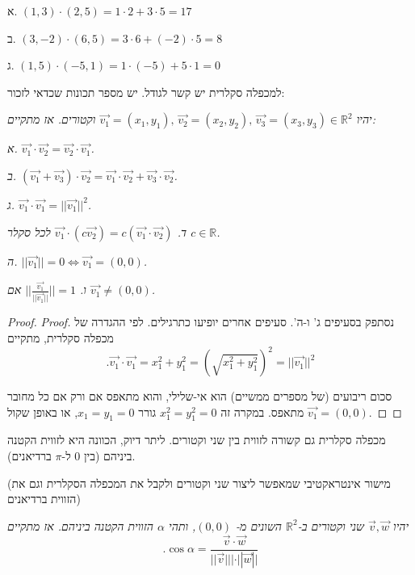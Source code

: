 \documentclass[
  hebrew,
  12pt,
  a4paper,
  oneside]{book}
\theoremstyle{definition}
\theoremstyle{remark}
\theoremstyle{plain}
\theoremstyle{remark}
\begin{document}
\begin{example}

א. \((1,3)\cdot(2,5)=1\cdot2+3\cdot5=17\)

ב. \((3,-2)\cdot(6,5)=3\cdot6+(-2)\cdot5=8\)

ג. \((1,5)\cdot(-5,1)=1\cdot(-5)+5\cdot1=0\)

\end{example}

למכפלה סקלרית יש קשר לגודל. יש מספר תכונות שכדאי לזכור:

\begin{proposition}

\emph{יהיו
\(\vec{v_{1}}=(x_{1},y_{1}),\,\vec{v_{2}}=(x_{2},y_{2}),\,\vec{v_{3}}=(x_{3},y_{3})\in\mathbb{R}^{2}\)
וקטורים. אז מתקיים:}

\emph{א. \(\vec{v_{1}}\cdot\vec{v_{2}}=\vec{v_{2}}\cdot\vec{v_{1}}\).}

\emph{ב.
\((\vec{v_{1}}+\vec{v_{3}})\cdot\vec{v_{2}}=\vec{v_{1}}\cdot\vec{v_{2}}+\vec{v_{3}}\cdot\vec{v_{2}}\).}

\emph{ג. \(\vec{v_{1}}\cdot\vec{v_{1}}=||\vec{v_{1}}||^{2}\).}

\emph{ד.
\(\vec{v_{1}}\cdot(c\vec{v_{2}})=c(\vec{v_{1}}\cdot\vec{v_{2}})\) לכל
סקלר \(c\in\mathbb{R}\).}

\emph{ה. \(||\vec{v_{1}}||=0\iff\vec{v_{1}}=(0,0)\).}

\emph{ו. \(||\frac{\vec{v_{1}}}{||\vec{v_{1}}||}||=1\) אם
\(\vec{v_{1}}\neq(0,0)\).}

\end{proposition}

\begin{proof}
\emph{Proof.} נסתפק בסעיפים ג' ו-ה'. סעיפים אחרים יופיעו כתרגילים. לפי
ההגדרה של מכפלה סקלרית, מתקיים
\[.\vec{v_{1}}\cdot\vec{v_{1}}=x_{1}^{2}+y_{1}^{2}=\left(\sqrt{x_{1}^{2}+y_{1}^{2}}\right)^{2}=||\vec{v_{1}}||^{2}\]

סכום ריבועים (של מספרים ממשיים) הוא אי-שלילי, והוא מתאפס אם ורק אם כל
מחובר מתאפס. במקרה זה \(x_{1}^{2}=y_{1}^{2}=0\) גורר \(x_{1}=y_{1}=0\),
או באופן שקול \(\vec{v_{1}}=(0,0)\).~◻
\end{proof}

מכפלה סקלרית גם קשורה לזווית בין שני וקטורים. ליתר דיוק, הכוונה היא
לזווית הקטנה ביניהם (בין \(0\) ל-\(\pi\) ברדיאנים).

(מישור אינטראקטיבי שמאפשר ליצור שני וקטורים ולקבל את המכפלה הסקלרית וגם
את הזווית ברדיאנים)

\begin{proposition}

\emph{יהיו \(\vec{v},\vec{w}\) שני וקטורים ב-\(\mathbb{R}^{2}\) השונים
מ- \((0,0)\), ותהי \(\alpha\) הזווית הקטנה ביניהם. אז מתקיים
\[\label{eq:cosine-scalar}
    .\cos\alpha=\frac{\vec{v}\cdot\vec{w}}{||\vec{v}|||\cdot||\vec{w}||}\]}

\end{proposition}
\end{document}
